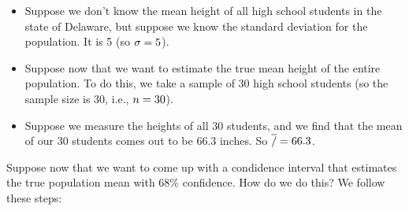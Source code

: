 \documentclass[../../../main.tex]{subfiles}
\begin{document}
\begin{itemize}

  \item Suppose we don't know the mean height of all high school students in the state of Delaware, but suppose we know the standard deviation for the population. It is 5 (so $\sigma = 5$). 

  \item Suppose now that we want to estimate the true mean height of the entire population. To do this, we take a sample of 30 high school students (so the sample size is 30, i.e., $\samplesize/ = 30$). 

  \item Suppose we measure the heights of all 30 students, and we find that the mean of our 30 students comes out to be 66.3 inches. So $\overline{/} = 66.3$. 

\end{itemize}

\noindent
Suppose now that we want to come up with a condidence interval that estimates the true population mean with 68\% confidence. How do we do this? We follow these steps:
\end{document}
